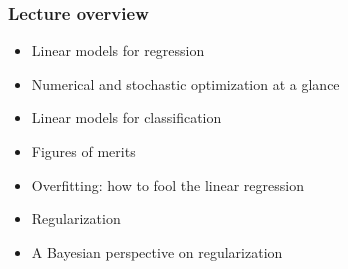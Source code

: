 \documentclass[usenames,dvipsnames,aspectratio=169]{beamer}
\begin{document}


\begin{frame}[plain]
\titlepage
\end{frame}


\begin{frame}
\frametitle{Lecture overview}



\begin{itemize}

\item Linear models for regression
\item Numerical and stochastic optimization at a glance 
\item Linear models for classification
\item Figures of merits
\item Overfitting: how to fool the linear regression
\item Regularization
\item A Bayesian perspective on regularization
\end{itemize}

\end{frame}






\end{document}
